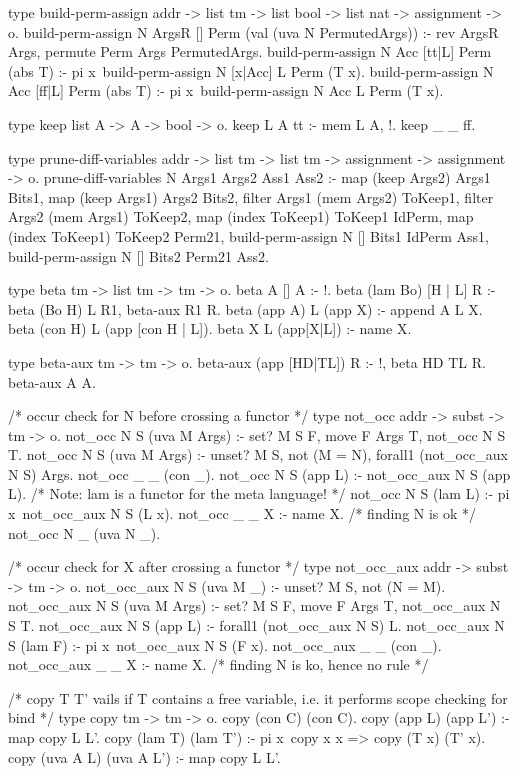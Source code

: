 \begin{elpicode}
  type build-perm-assign addr -> list tm -> list bool -> 
                      list nat -> assignment -> o.
  build-perm-assign N ArgsR [] Perm (val (uva N PermutedArgs)) :- 
    rev ArgsR Args, permute Perm Args PermutedArgs.
  build-perm-assign N Acc [tt|L] Perm (abs T) :- 
    pi x\ build-perm-assign N [x|Acc] L Perm (T x).
  build-perm-assign N Acc [ff|L] Perm (abs T) :- 
    pi x\ build-perm-assign N Acc L Perm (T x).

  type keep list A -> A -> bool -> o.
  keep L A tt :- mem L A, !.
  keep _ _ ff.

  type prune-diff-variables addr -> list tm -> list tm -> 
                            assignment -> assignment -> o.
  prune-diff-variables N Args1 Args2 Ass1 Ass2 :-
    map (keep Args2) Args1 Bits1, 
    map (keep Args1) Args2 Bits2,
    filter Args1 (mem Args2) ToKeep1,
    filter Args2 (mem Args1) ToKeep2,
    map (index ToKeep1) ToKeep1 IdPerm,
    map (index ToKeep1) ToKeep2 Perm21,
    build-perm-assign N [] Bits1 IdPerm Ass1,
    build-perm-assign N [] Bits2 Perm21 Ass2.

  type beta tm -> list tm -> tm -> o.
  beta A [] A :- !.
  beta (lam Bo) [H | L] R :- beta (Bo H) L R1, beta-aux R1 R.
  beta (app A) L (app X) :- append A L X.
  beta (con H) L (app [con H | L]).
  beta X L (app[X|L]) :- name X.

  type beta-aux tm -> tm -> o.
  beta-aux (app [HD|TL]) R :- !, beta HD TL R.
  beta-aux A A. 

  /* occur check for N before crossing a functor */
  type not_occ  addr -> subst -> tm -> o.
  not_occ N S (uva M Args) :- set? M S F, 
    move F Args T, not_occ N S T.
  not_occ N S (uva M Args) :- unset? M S, not (M = N),
    forall1 (not_occ_aux N S) Args.
  not_occ _ _ (con _).
  not_occ N S (app L) :- not_occ_aux N S (app L).
  /* Note: lam is a functor for the meta language! */
  not_occ N S (lam L) :- pi x\ not_occ_aux N S (L x).
  not_occ _ _ X :- name X.
  /* finding N is ok */
  not_occ N _ (uva N _).

  /* occur check for X after crossing a functor */
  type not_occ_aux addr -> subst -> tm -> o.
  not_occ_aux N S (uva M _) :- unset? M S, not (N = M).
  not_occ_aux N S (uva M Args) :- set? M S F, 
    move F Args T, not_occ_aux N S T.
  not_occ_aux N S (app L) :- forall1 (not_occ_aux N S) L.
  not_occ_aux N S (lam F) :- pi x\ not_occ_aux N S (F x).
  not_occ_aux _ _ (con _).
  not_occ_aux _ _ X :- name X.
  /* finding N is ko, hence no rule */
  
  /* copy T T' vails if T contains a free variable, i.e. it
     performs scope checking for bind */
  type copy tm -> tm -> o.
  copy (con C)   (con C).
  copy (app L)   (app L') :- map copy L L'.
  copy (lam T)   (lam T') :- pi x\ copy x x => copy (T x) (T' x).
  copy (uva A L) (uva A L') :- map copy L L'.


\end{elpicode}
